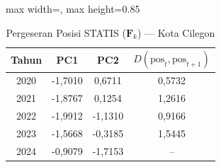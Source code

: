 \begin{table}[H]
\centering
\caption{Pergeseran Posisi STATIS ($\mathbf{F}_k$) --- Kota Cilegon} \label{tab:app1jarak_statis_skor_kota_cilegon}
\begin{adjustbox}{max width=\textwidth, max height=0.85\textheight}
\begin{tabular}{|c|c|c|c|}
\hline
\textbf{Tahun} & \textbf{PC1} & \textbf{PC2} & \textbf{$D(\text{pos}_t, \text{pos}_{t+1})$} \\
\hline
2020 & -1,7010 & 0,6711 & 0,5732 \\
2021 & -1,8767 & 0,1254 & 1,2616 \\
2022 & -1,9912 & -1,1310 & 0,9166 \\
2023 & -1,5668 & -0,3185 & 1,5445 \\
2024 & -0,9079 & -1,7153 & -- \\
\hline
\end{tabular}
\end{adjustbox}
\end{table}